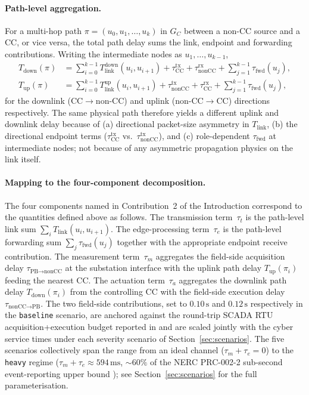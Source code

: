 \paragraph{Path-level aggregation.}
For a multi-hop path $\pi=(u_0,u_1,\dots,u_k)$ in $G_C$ between a
non-CC source and a CC, or vice versa, the total path delay sums
the link, endpoint and forwarding contributions.  Writing the
intermediate nodes as $u_1,\dots,u_{k-1}$,
\begin{align}
  T_{\text{down}}(\pi) &=
    \sum_{i=0}^{k-1}T_{\text{link}}^{\text{down}}(u_i,u_{i+1})
    + \tau_{\text{CC}}^{\text{tx}} + \tau_{\text{nonCC}}^{\text{rx}}
    + \!\!\sum_{j=1}^{k-1}\!\tau_{\text{fwd}}(u_j),
    \label{eq:Tdown}\\[2pt]
  T_{\text{up}}(\pi) &=
    \sum_{i=0}^{k-1}T_{\text{link}}^{\text{up}}(u_i,u_{i+1})
    + \tau_{\text{nonCC}}^{\text{tx}} + \tau_{\text{CC}}^{\text{rx}}
    + \!\!\sum_{j=1}^{k-1}\!\tau_{\text{fwd}}(u_j),
    \label{eq:Tup}
\end{align}
for the downlink (CC$\to$non-CC) and uplink (non-CC$\to$CC)
directions respectively.  The same physical path therefore yields a
different uplink and downlink delay because of (a) directional
packet-size asymmetry in $T_{\text{link}}$, (b) the directional
endpoint terms ($\tau_{\text{CC}}^{\text{tx}}$ vs.\
$\tau_{\text{nonCC}}^{\text{tx}}$), and (c) role-dependent
$\tau_{\text{fwd}}$ at intermediate nodes; not because of any
asymmetric propagation physics on the link itself.

\paragraph{Mapping to the four-component decomposition.}
The four components named in Contribution~2 of the Introduction
correspond to the quantities defined above as follows.  The
transmission term~$\tau_t$ is the path-level link sum
$\sum_i T_{\text{link}}(u_i,u_{i+1})$.  The edge-processing
term~$\tau_e$ is the path-level forwarding sum
$\sum_j \tau_{\text{fwd}}(u_j)$ together with the appropriate
endpoint receive contribution.  The measurement
term~$\tau_m$ aggregates the field-side acquisition delay
$\tau_{\text{PB}\to\text{nonCC}}$ at the substation interface with the
uplink path delay $T_{\text{up}}(\pi_i)$ feeding the nearest CC.
The actuation term~$\tau_a$ aggregates the downlink path delay
$T_{\text{down}}(\pi_i)$ from the controlling CC with the field-side
execution delay $\tau_{\text{nonCC}\to\text{PB}}$.  The two field-side
contributions, set to $0.10\,\text{s}$ and $0.12\,\text{s}$
respectively in the \texttt{baseline} scenario, are anchored against
the round-trip SCADA RTU acquisition+execution budget reported in
\citep{NASPI_LatencyGuidelines} and are scaled jointly with the
cyber service times under each severity scenario of
Section~\ref{sec:scenarios}.  The five scenarios collectively span
the range from an ideal channel ($\tau_m+\tau_e=0$) to the
\texttt{heavy} regime
($\tau_m+\tau_e\!\approx\!594\,\text{ms}$, ${\sim}60\%$ of the
NERC PRC-002-2 sub-second event-reporting upper bound
\citep{NERC_PRC002}); see Section~\ref{sec:scenarios} for the full
parameterisation.

